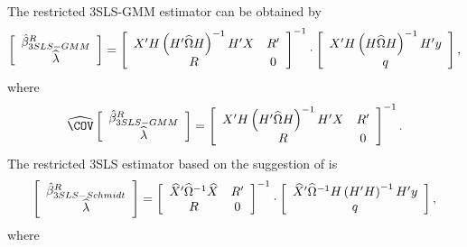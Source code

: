 The restricted 3SLS-GMM estimator can be obtained by
\begin{equation}
   \left[ \begin{array}{c}
      \hat{\beta}^R_{3SLS-GMM} \\ \widehat{\lambda}
   \end{array} \right]
   =
   \left[ \begin{array}{cc}
      X' H \left( H' \widehat{\Omega} H \right)^{-1} H' X & R' \\
      R & 0
   \end{array} \right]^{-1}
   \cdot
   \left[ \begin{array}{c}
      X' H \left( H \widehat{\Omega} H \right)^{-1} H' y \\ q
   \end{array} \right] ,
   \label{eq:3slsGmmR}
\end{equation}
where
\begin{equation}
   \COVHat
   \left[ \begin{array}{c}
      \bHat^R_{3SLS-GMM} \\ \widehat{\lambda}
   \end{array} \right] 
   = 
   \left[ \begin{array}{cc}
      X' H \left( H' \OHat H \right)^{-1} H' X & R' \\
      R & 0
   \end{array} \right]^{-1} .
\end{equation}
The restricted 3SLS estimator based on the suggestion of
\cite{schmidt90} is
\begin{equation}
   \left[ \begin{array}{c}
      \hat{\beta}^R_{3SLS-Schmidt} \\ \widehat{\lambda}
   \end{array} \right]
   =
   \left[ \begin{array}{cc}
      \widehat{X}' \widehat{\Omega}^{-1} \widehat{X} & R' \\
      R & 0
   \end{array} \right]^{-1}
   \cdot
   \left[ \begin{array}{c}
      \widehat{X}' \widehat{\Omega}^{-1} H \left( H' H \right)^{-1} H' y \\ q
   \end{array} \right] ,
   \label{eq:3slsSchmidtR}
\end{equation}
where
